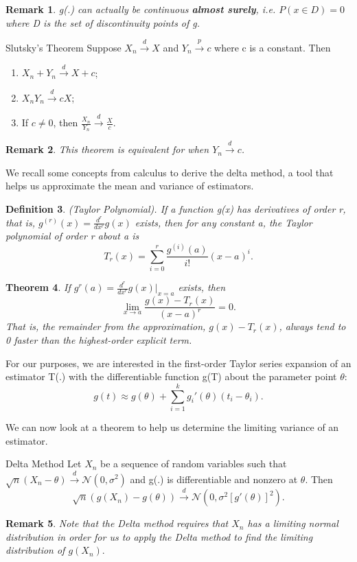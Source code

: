 \documentclass[twoside]{article}
\newcounter{lecnum}
\newtheorem{theorem}{Theorem}[lecnum]
\newtheorem{definition}[theorem]{Definition}
\newtheorem{remark}[theorem]{Remark}
\begin{document}
\begin{remark}g(.) can actually be continuous \textbf{almost surely}, i.e. $P(x \in D) = 0$ where D is the set of discontinuity points of g.
\end{remark}

\begin{theorem_exam}{Slutsky's Theorem}{} Suppose $X_n \xrightarrow{d} X$ and $Y_n \xrightarrow{p} c$ where c is a constant. Then 
\begin{enumerate}
    \item $X_n + Y_n \xrightarrow{d} X + c$;
    \item $X_nY_n \xrightarrow{d} cX$;
    \item If $c \neq 0$, then $\frac{X_n}{Y_n} \xrightarrow{d} \frac{X}{c}.$
\end{enumerate}
\end{theorem_exam}

\begin{remark}This theorem is equivalent for when $Y_n \xrightarrow{d} c$.
\end{remark}

We recall some concepts from calculus to derive the delta method, a tool that helps us approximate the mean and variance of estimators.

\begin{definition}(Taylor Polynomial). If a function g(x) has derivatives of order r, that is, $g^{(r)}(x) = \frac{d^r}{dx^r}g(x)$ exists, then for any constant a, the Taylor polynomial of order r about a is 
$$
T_r(x) = \sum_{i=0}^{r}\frac{g^{(i)}(a)}{i!}(x - a)^{i}.
$$
\end{definition}

\begin{theorem}If $g^{r}(a) = \frac{d^r}{dx^r}g(x)|_{x = a}$ exists, then 
$$
\lim_{x \rightarrow a}\frac{g(x) - T_r(x)}{(x - a)^r} = 0.
$$
That is, the remainder from the approximation, $g(x) - T_r(x)$, always tend to 0 faster than the highest-order explicit term.
\end{theorem}

For our purposes, we are interested in the first-order Taylor series expansion of an estimator T(.) with the differentiable function g(T) about the parameter point $\theta$:
$$
g(t) \approx g(\theta) + \sum_{i=1}^{k}g_i'(\theta)(t_i - \theta_i).
$$

We can now look at a theorem to help us determine the limiting variance of an estimator.

\begin{theorem_exam}{Delta Method}{} Let $X_n$ be a sequence of random variables such that  $\sqrt{n}(X_n - \theta) \xrightarrow{d} \mathcal{N}(0, \sigma^2)$ and g(.) is differentiable and nonzero at $\theta$. Then 
$$
\sqrt{n}(g(X_n) - g(\theta)) \xrightarrow{d} \mathcal{N}(0, \sigma^2[g'(\theta)]^2).
$$
\end{theorem_exam}
\begin{remark}Note that the Delta method requires that $X_n$ has a limiting normal distribution in order for us to apply the Delta method to find the limiting distribution of $g(X_n).$
\end{remark}
\end{document}
